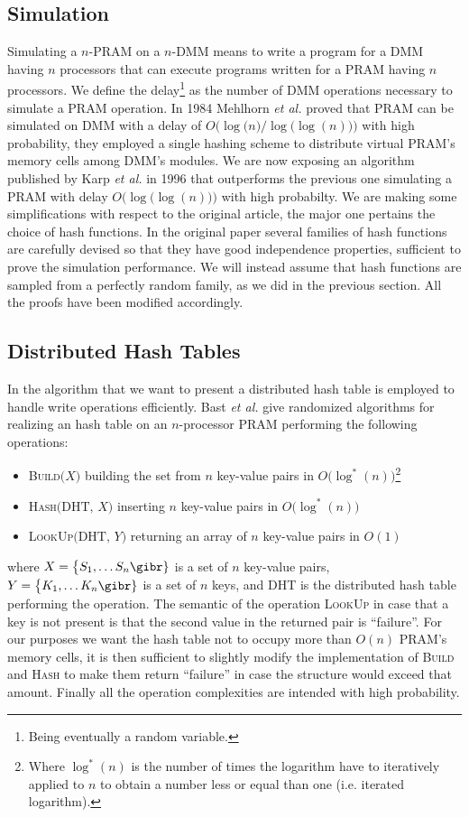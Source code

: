 \subsection{Simulation}
Simulating a $n$-PRAM on a $n$-DMM means to write a program for a DMM having
$n$ processors that can execute programs written for a PRAM having
$n$ processors. We define the delay\footnote{Being eventually
  a random variable.} as the number of DMM operations necessary to simulate
a PRAM operation. In 1984 Mehlhorn {\em et al.} \cite{art} proved that PRAM
can be simulated on DMM with a delay of $O\bigl(\log\bigl(n\bigr)\bigr / \log\bigl(\log(n)\bigr))$
with high probability, they employed a single hashing scheme to
distribute virtual PRAM's
 memory cells among DMM's modules. 
We are now exposing an algorithm published by Karp {\em et al.} \cite{Karp} in
1996 that
outperforms the previous one simulating a PRAM with delay
$O\bigl(\log\bigl(\log(n)\bigr)\bigr)$ with high probabilty.
We are making some simplifications with respect to the original article,
the major one pertains the choice of hash functions.
In the original paper several families of hash
functions are carefully
devised so that they have good independence properties,
sufficient to prove the simulation 
performance. We will instead assume that hash functions are sampled from
a perfectly random family, as we did in the previous section. All the proofs
have been modified accordingly.

\subsection{Distributed Hash Tables}
In the algorithm that we want to present a distributed hash
table is employed to handle write operations efficiently.
Bast {\em et al.} \cite{Bast}
give randomized algorithms for realizing an hash table on an $n$-processor PRAM
performing the following operations:
\begin{itemize}
\item \textsc{Build}$\bigl(X\bigr)$ building the set from $n$ key-value
  pairs in $O\bigl(\log^*(n)\bigr)$\footnote{Where $\log^*(n)$ is the number of
    times the logarithm have to iteratively applied to $n$ to obtain a number
    less or equal than one (i.e. iterated logarithm).}
\item \textsc{Hash}$\bigl(\text{DHT, }X\bigr)$ inserting $n$ key-value pairs in  
  $O\bigl(\log^*(n)\bigr)$
\item \textsc{LookUp}$\bigl(\text{DHT, }Y\bigr)$ returning an array of $n$ key-value pairs in $O(1)$
\end{itemize}
where $X = \bigl\{S_1, \dots S_n\gibr\}$ is a set of $n$ key-value pairs,
$Y = \bigl\{K_1, \dots K_n\gibr\}$ is a set of $n$ keys, and DHT is the
distributed hash table performing the operation.
The semantic of the operation \textsc{LookUp} in case that a key is not present is that
the second value in the returned pair is ``failure''. For our purposes we want
the hash table not to occupy more than $O(n)$ PRAM's memory cells, it is
then sufficient to slightly modify the implementation of \textsc{Build} and
\textsc{Hash}
to make them return ``failure'' in case the structure would exceed that amount.
Finally all the operation complexities are intended with high probability.

